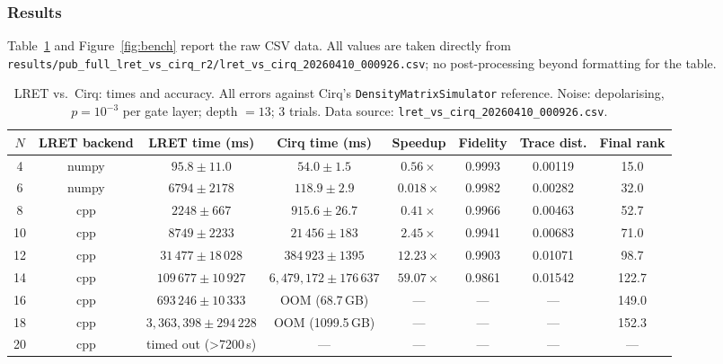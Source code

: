 \documentclass[11pt,a4paper]{article}
\begin{document}
\subsubsection*{Results}

Table~\ref{tab:bench} and Figure~\ref{fig:bench} report the raw CSV data. All values
are taken directly from
\nolinkurl{results/pub_full_lret_vs_cirq_r2/lret_vs_cirq_20260410_000926.csv};
no post-processing beyond formatting for the table.

\begin{table}[!h]
\centering
\renewcommand{\arraystretch}{1.2}
\caption{LRET vs.\ Cirq: times and accuracy. All errors against Cirq's
\texttt{DensityMatrixSimulator} reference. Noise: depolarising, $p=10^{-3}$ per gate
layer; depth $=13$; 3 trials.
Data source: \texttt{lret\_vs\_cirq\_20260410\_000926.csv}.}
\label{tab:bench}
\small
\begin{tabular}{@{}cccccccc@{}}
\toprule
$N$ & LRET backend & LRET time (ms) & Cirq time (ms) & Speedup & Fidelity & Trace dist. & Final rank \\
\midrule
4  & numpy & $95.8 \pm 11.0$             & $54.0 \pm 1.5$              & $0.56\times$   & 0.9993 & 0.00119 & 15.0 \\
6  & numpy & $6794 \pm 2178$             & $118.9 \pm 2.9$             & $0.018\times$  & 0.9982 & 0.00282 & 32.0 \\
8  & cpp   & $2248 \pm 667$              & $915.6 \pm 26.7$            & $0.41\times$   & 0.9966 & 0.00463 & 52.7 \\
10 & cpp   & $8749 \pm 2233$             & $21\,456 \pm 183$           & $2.45\times$   & 0.9941 & 0.00683 & 71.0 \\
12 & cpp   & $31\,477 \pm 18\,028$       & $384\,923 \pm 1395$         & $12.23\times$  & 0.9903 & 0.01071 & 98.7 \\
14 & cpp   & $109\,677 \pm 10\,927$      & $6{,}479{,}172 \pm 176\,637$ & $59.07\times$  & 0.9861 & 0.01542 & 122.7 \\
16 & cpp   & $693\,246 \pm 10\,333$      & OOM (68.7\,GB)              & ---            & ---    & ---     & 149.0 \\
18 & cpp   & $3{,}363{,}398 \pm 294\,228$ & OOM (1099.5\,GB)           & ---            & ---    & ---     & 152.3 \\
20 & cpp   & timed out (>7200\,s)        & ---                         & ---            & ---    & ---     & ---   \\
\bottomrule
\end{tabular}
\end{table}
\end{document}
